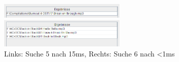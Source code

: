 \documentclass[12pt,a4paper,ngerman]{report}
\begin{document}
\begin{figure}[h!]
\centering
	\begin{minipage}[b]{7cm}
	\includegraphics[width=6cm]{img/search5_simAn_15.png}
	\end{minipage}
	\begin{minipage}[b]{7cm}
	\includegraphics[width=6cm]{img/search6_simAn_0.png}
	\end{minipage}
\caption{Links: Suche 5 nach 15ms, Rechts: Suche 6 nach \textless 1ms\protect\footnotemark}
\end{figure}
 \newpage
\end{document}
